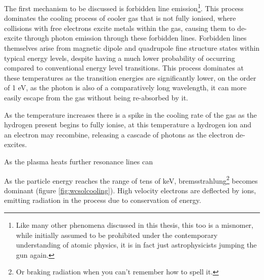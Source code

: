 The first mechanism to be discussed is forbidden line emission\footnote{Like many other phenomena discussed in this thesis, this too is a misnomer, while initially assumed to be prohibited under the contemporary understanding of atomic physics, it is in fact just astrophysicists jumping the gun again.}.
This process dominates the cooling process of cooler gas that is not fully ionised, where collisions with free electrons excite metals within the gas, causing them to de-excite through photon emission through these forbidden lines.
Forbidden lines themselves arise from magnetic dipole and quadrupole fine structure states within typical energy levels, despite having a much lower probability of occurring compared to conventional energy level transitions.
This process dominates at these temperatures as the transition energies are significantly lower, on the order of 1 \si{\electronvolt}, as the photon is also of a comparatively long wavelength, it can more easily escape from the gas without being re-absorbed by it.


As the temperature increases there is a spike in the cooling rate of the gas as the hydrogen present begins to fully ionise, at this temperature a hydrogen ion and an electron may recombine, releasing a cascade of photons as the electron de-excites.


As the plasma heats further resonance lines can


As the particle energy reaches the range of tens of \si{\kilo\electronvolt}, bremsstrahlung\footnote{Or braking radiation when you can't remember how to spell it.} becomes dominant (figure \ref{fig:wcsolcooling}). High velocity electrons are deflected by ions, emitting radiation in the process due to conservation of energy. 

\parencite{schureNewRadiativeCooling2009}
\parencite{rybickiRadiativeProcessesAstrophysics2004}




